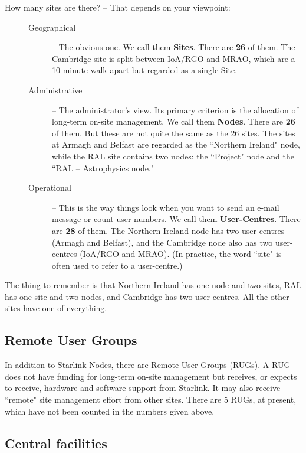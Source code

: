How many sites are there? -- That depends on your viewpoint:
\begin{description}
\item[\mbox{}]\mbox{}
\begin{description}
\item [Geographical] --
 The obvious one.
 We call them {\bf Sites}.
 There are {\bf 26} of them.
 The Cambridge site is split between IoA/RGO and MRAO, which are a 10-minute
 walk apart but regarded as a single Site.
\item [Administrative] --
 The administrator's view.
 Its primary criterion is the allocation of long-term  on-site management.
 We call them {\bf Nodes}.
 There are {\bf 26} of them.
 But these are not quite the same as the 26 sites.
 The sites at Armagh and Belfast are regarded as the ``Northern Ireland" node,
 while the RAL site contains two nodes: the ``Project" node and the
 ``RAL -- Astrophysics node."
\item [Operational] --
 This is the way things look when you want to send an e-mail message or
 count user numbers.
 We call them {\bf User-Centres}.
 There are {\bf 28} of them.
 The Northern Ireland node has two user-centres (Armagh and Belfast), and
 the Cambridge node also has two user-centres (IoA/RGO and MRAO).
 (In practice, the word ``site" is often used to refer to a user-centre.)
\end{description}
\end{description}
The thing to remember is that Northern Ireland has one node and two sites,
RAL has one site and two nodes, and Cambridge has two user-centres.
All the other sites have one of everything.

\subsection*{Remote User Groups}

In addition to Starlink Nodes, there are Remote User Groups (RUGs).
A RUG does not have funding for long-term on-site management but receives,
or expects to receive, hardware and software support from Starlink.
It may also receive ``remote" site management effort from other sites.
There are 5 RUGs, at present, which have not been counted in the numbers
given above.

\subsection*{Central facilities}

